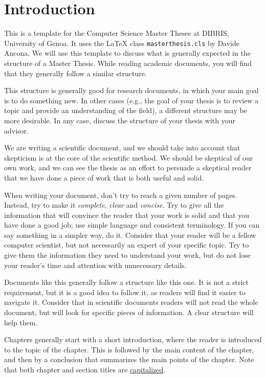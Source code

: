 \chapter{Introduction}
\label{sec:introduction}

This is a template for the Computer Science Master Theses at DIBRIS,
University of Genoa. It uses the \xspace{\LaTeX} class \texttt{masterthesis.cls} by
Davide Ancona. We will use this template to discuss what is generally expected in the
structure of a Master Thesis. While reading academic documents, you will find that
they generally follow a similar structure.

This structure is generally good for research documents, in which your main goal is to do
something new. In other cases (e.g., the goal of your thesis is to review a topic and provide
an understanding of the field), a different structure may be more desirable. In any case,
discuss the structure of your thesis with your advisor.

We are writing a scientific document, and we should take into account that skepticism
is at the core of the scientific method. We should be skeptical of our own work, and
we can see the thesis as an effort to persuade a skeptical reader that we have done
a piece of work that is both useful and solid.

When writing your document, don't try to reach a given number of pages. Instead, try to make it
\emph{complete}, \emph{clear} and \emph{concise}. Try to give all the information that will
convince the reader that your work is solid and that you have done a good job; use simple
language and consistent terminology. If you can say something in a simpler way, do it.
Consider that your reader will be a fellow computer scientist, but not necessarily an expert
of your specific topic. Try to give them the information they need to understand your work, but
do not lose your reader's time and attention with unnecessary details.

Documents like this generally follow a structure like this one. It is not a strict
requirement, but it is a good idea to follow it, as readers will find it easier to navigate it.
Consider that in scientific documents readers will not read the whole document,
but will look for specific pieces of information. A clear structure will help them.

Chapters generally start with a short introduction, where the reader is introduced to the topic
of the chapter. This is followed by the main content of the chapter, and then by a conclusion
that summarizes the main points of the chapter. Note that both chapter and section titles are
\href{https://www.grammarly.com/blog/capitalization-in-the-titles/}{capitalized}.

